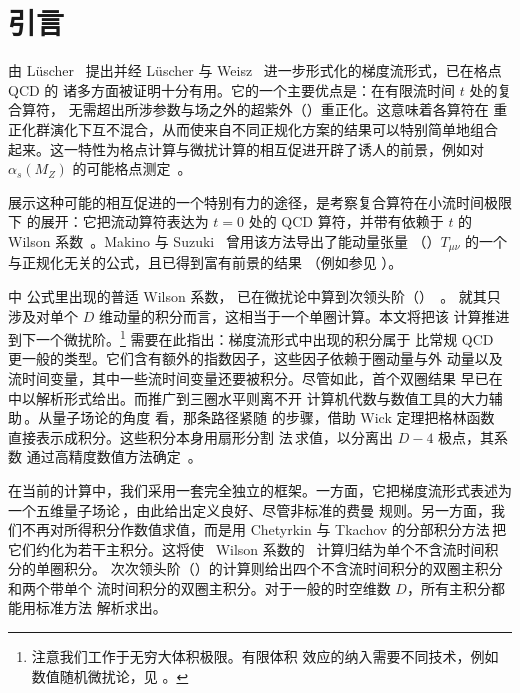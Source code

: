 \section{引言}\label{sec:intro}

由 L\"uscher~\cite{Luscher:2010iy} 提出并经 L\"uscher 与
Weisz~\cite{Luscher:2011bx} 进一步形式化的梯度流形式，已在格点 QCD 的
诸多方面被证明十分有用。它的一个主要优点是：在有限流时间 $t$ 处的复合算符，
无需超出所涉参数与场之外的超紫外（）重正化。这意味着各算符在
重正化群演化下互不混合，从而使来自不同正规化方案的结果可以特别简单地组合
起来。这一特性为格点计算与微扰计算的相互促进开辟了诱人的前景，例如对
$\alpha_s(M_Z)$ 的可能格点测定~\cite{Harlander:2016vzb}。

展示这种可能的相互促进的一个特别有力的途径，是考察复合算符在小流时间极限下
的展开：它把流动算符表达为 $t=0$ 处的 QCD 算符，并带有依赖于 $t$ 的
Wilson 系数~\cite{Luscher:2011bx}。Makino 与
Suzuki~\cite{Suzuki:2013gza,Makino:2014taa} 曾用该方法导出了能动量张量
（\emt）$T_{\mu\nu}$ 的一个与正规化无关的公式，且已得到富有前景的结果
（例如参见
）。

 中  公式里出现的普适 Wilson 系数，
已在微扰论中算到次领头阶（\nlo）~\cite{Suzuki:2013gza,Makino:2014taa}。
就其只涉及对单个 $D$ 维动量的积分而言，这相当于一个单圈计算。本文将把该
计算推进到下一个微扰阶。\footnote{注意我们工作于无穷大体积极限。有限体积
  效应的纳入需要不同技术，例如数值随机微扰论，见
  。} 需要在此指出：梯度流形式中出现的积分属于
比常规 QCD 更一般的类型。它们含有额外的指数因子，这些因子依赖于圈动量与外
动量以及流时间变量，其中一些流时间变量还要被积分。尽管如此，首个双圈结果
早已在  中以解析形式给出。而推广到三圈水平则离不开
计算机代数与数值工具的大力辅助\,\cite{Harlander:2016vzb}。从量子场论的角度
看，那条路径紧随  的步骤，借助 Wick 定理把格林函数
直接表示成积分。这些积分本身用扇形分割
法\,\cite{Binoth:2003ak,Smirnov:2013eza}求值，以分离出 $D-4$ 极点，其系数
通过高精度数值方法确定~\cite{genz,holodborodko}。

在当前的计算中，我们采用一套完全独立的框架。一方面，它把梯度流形式表述为
一个五维量子场论\,\cite{Luscher:2011bx}，由此给出定义良好、尽管非标准的费曼
规则。另一方面，我们不再对所得积分作数值求值，而是用 Chetyrkin 与 Tkachov
的分部积分方法\,\cite{Chetyrkin:1981qh}把它们约化为若干主积分。这将使
\emt\ Wilson 系数的 \nlo\ 计算归结为单个不含流时间积分的单圈积分。
次次领头阶（\nnlo）的计算则给出四个不含流时间积分的双圈主积分和两个带单个
流时间积分的双圈主积分。对于一般的时空维数 $D$，所有主积分都能用标准方法
解析求出。


